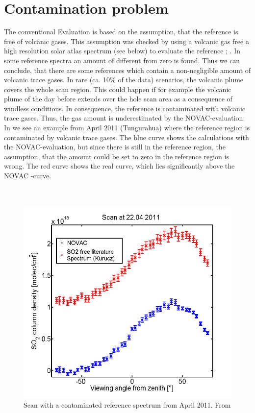 \section{Contamination problem\label{Chap:Cont}}
The conventional Evaluation is based on the assumption, that the reference is free of volcanic gases. This assumption was checked by using a volcanic gas free a high resolution solar atlas spectrum (see below) to evaluate the reference \cite{lubcke2014}; \cite{salerno2009novel}. In some reference spectra an amount of   different from zero is found. Thus we can conclude, that there are some references which contain a non-negligible amount of volcanic trace gases.
In rare (ca. 10\% of the data) scenarios, the
volcanic plume covers the whole scan region.
This could happen if for example the volcanic plume of the day before extends over the hole scan area as a consequence of windless conditions.
In consequence, the reference	is contaminated with volcanic trace gases. Thus, the gas amount is underestimated by the NOVAC-evaluation: In  we see an example from April 2011 (Tungurahua) where the reference region is contaminated by volcanic trace gases. The blue  curve shows the calculations with the NOVAC-evaluation, but since there is still  in the reference region, the assumption, that the  amount could be set to zero in the reference region is wrong. The red curve shows the real  curve, which lies significantly above the NOVAC -curve.\\
\\	
%
\\
\begin{figure}
	\centering
	\includegraphics[width=0.7\linewidth]{Bilder/contaminated}
	\caption{Scan with a contaminated reference spectrum from April 2011. From \cite{WarnachSimon}}
	\label{fig:contaminated}
\end{figure}
